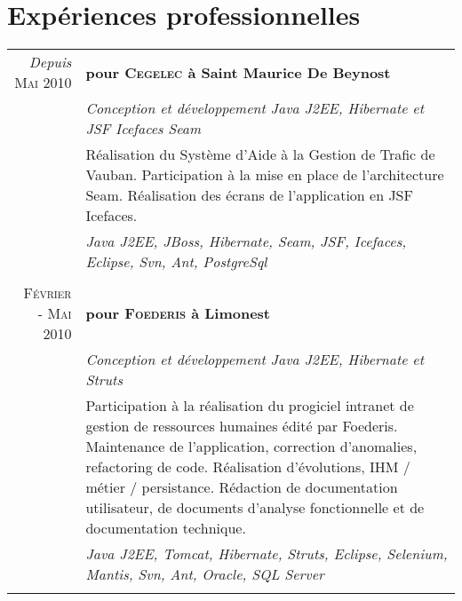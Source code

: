 \documentclass[a4paper,10pt]{article}
\begin{document}
\section{Expériences professionnelles}
\begin{tabular}{r|p{11cm}}
  \emph{Depuis} \textsc{Mai 2010}
  & \textbf{pour \textsc{Cegelec} à Saint Maurice De Beynost}                                                            \\ 
  & \emph{Conception et développement Java J2EE, Hibernate et JSF Icefaces Seam}                                         \\
  & \footnotesize{Réalisation du Système d'Aide à la Gestion de Trafic de Vauban. Participation à la mise en place de l'architecture Seam. Réalisation des écrans de l'application en JSF Icefaces.}                 \\
  & \emph{Java J2EE, JBoss, Hibernate, Seam, JSF, Icefaces, Eclipse, Svn, Ant, PostgreSql}                               \\
  \multicolumn{2}{c}{}                                                                                                   \\
  \textsc{Février - Mai 2010}
  & \textbf{pour \textsc{Foederis} à Limonest}                                                                           \\ 
  & \emph{Conception et développement Java J2EE, Hibernate et Struts}                                                    \\
  & \footnotesize{Participation à la réalisation du progiciel intranet de gestion de ressources humaines édité par Foederis. Maintenance de l'application, correction d'anomalies, refactoring de code. Réalisation d'évolutions, IHM / métier / persistance. Rédaction de documentation utilisateur, de documents d'analyse fonctionnelle et de documentation technique.}   \\
  & \emph{Java J2EE, Tomcat, Hibernate, Struts, Eclipse, Selenium, Mantis, Svn, Ant, Oracle, SQL Server}                 \\
  \multicolumn{2}{c}{}                                                                                                   \\
\end{tabular}
\newpage
\end{document}
